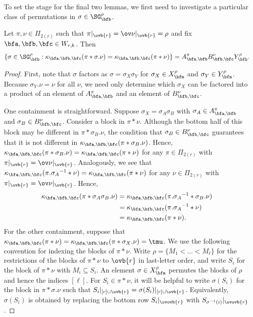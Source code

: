 To set the stage for the final two lemmas, we first need to investigate a particular class of permutations in $\sigma\in\SG_\bfb^\rho$.

\begin{lemma}\label{moveMiddleWithoutChangingMSP} Let $\pi, \nu\in\Pi_{2(r)}$ such that $\pi|_{\ovb{r}}=\ov\nu|_{\ovb{r}}=\rho$ and fix $\bfa,\bfb,\bfc\in W_{r,k}$. Then \[\{\sigma\in \SG_\bfb^\rho:\kappa_{\bfa,\bfb,\bfc}(\pi\ast \sigma.\nu)=\kappa_{\bfa,\bfb,\bfc}(\pi\ast\nu)\}=A_{\bfa,\bfb}^\pi B_{\bfb,\bfc}^{\nu}Y_{\bfb}^\rho.\]
\end{lemma}

\begin{proof}
First, note that $\sigma$ factors as $\sigma=\sigma_X\sigma_Y$ for $\sigma_X\in X_\bfm^\rho$ and $\sigma_Y\in Y_\bfm^\rho$. Because $\sigma_Y.\nu=\nu$ for all $\nu$, we need only determine which $\sigma_X$ can be factored into a product of an element of $A_{\bfa,\bfb}^\pi$ and an element of $B_{\bfb,\bfc}^\nu$.

One containment is straightforward. Suppose $\sigma_X=\sigma_A\sigma_B$ with $\sigma_A\in A_{\bfa,\bfb}^{\pi}$ and $\sigma_B\in B_{\bfb,\bfc}^{\nu}$. Consider a block in $\pi\ast\nu$. Although the bottom half of this block may be different in $\pi\ast \sigma_B.\nu$, the condition that $\sigma_B\in B_{\bfb,\bfc}^{\nu}$ guarantees that it is not different in $\kappa_{\bfa,\bfb,\bfc}(\pi\ast \sigma_B.\nu)$. Hence, $\kappa_{\bfa,\bfb,\bfc}(\pi\ast \sigma_B.\nu)=\kappa_{\bfa,\bfb,\bfc}(\pi\ast\nu)$ for any $\pi\in\Pi_{2(r)}$ with $\pi|_{\ovb{r}}=\ov\nu|_{\ovb{r}}$. Analogously, we see that $\kappa_{\bfa,\bfb,\bfc}(\pi.{\sigma_A}^{-1}\ast \nu)=\kappa_{\bfa,\bfb,\bfc}(\pi\ast\nu)$ for any $\nu\in\Pi_{2(r)}$ with $\pi|_{\ovb{r}}=\ov\nu|_{\ovb{r}}$. Hence,
\begin{align*}
    \kappa_{\bfa,\bfb,\bfc}(\pi\ast \sigma_A\sigma_B.\nu)&=\kappa_{\bfa,\bfb,\bfc}(\pi.{\sigma_A}^{-1}\ast \sigma_B.\nu)\\
    &=\kappa_{\bfa,\bfb,\bfc}(\pi.{\sigma_A}^{-1}\ast \nu)\\
    &=\kappa_{\bfa,\bfb,\bfc}(\pi\ast\nu).
\end{align*}
For the other containment, suppose that $\kappa_{\bfa,\bfb,\bfc}(\pi\ast\nu)=\kappa_{\bfa,\bfb,\bfc}(\pi\ast \sigma_X.\nu)=\tmu$. We use the following convention for indexing the blocks of $\pi\ast\nu$. Write $\rho=\{M_1<\dots< M_\ell\}$ for the restrictions of the blocks of $\pi\ast\nu$ to $\ovb{r}$ in last-letter order, and write $S_i$ for the block of $\pi\ast\nu$ with $M_i\subseteq S_i$. An element $\sigma\in X_\bfm^\rho$ permutes the blocks of $\rho$ and hence the indices $[\ell]$. For $S_i\in\pi\ast\nu$, it will be helpful to write $\sigma(S_i)$ for the block in $\pi\ast \sigma.\nu$ such that $S_i|_{[r]\cup\ovb{r}}=\sigma(S_i)|_{[r]\cup\ovb{r}}$. Equivalently, $\sigma(S_i)$ is obtained by replacing the bottom row $S_i|_{\ovovb{r}}$ with $S_{\sigma^{-1}(i)}|_{\ovovb{r}}$.


\end{proof}
